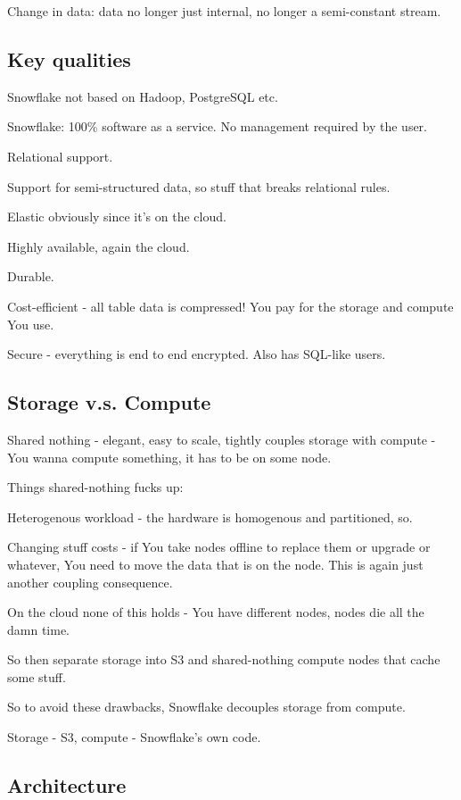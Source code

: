\documentclass{article}
\begin{document}
		Change in data: data no longer just internal, no longer a semi-constant stream.
	
	\subsection{Key qualities}
	
		Snowflake not based on Hadoop, PostgreSQL etc.
		
		Snowflake: 100\% software as a service. No management required by the user.
		
		Relational support.
		
		Support for semi-structured data, so stuff  that breaks relational rules.
		
		Elastic obviously since it's on the cloud.
		
		Highly available, again the cloud.
		
		Durable.
		
		Cost-efficient - all table data is compressed! You pay for the storage and compute You use. 
		
		Secure - everything is end to end encrypted. Also has SQL-like users.
		
	\subsection{Storage v.s. Compute}
	
		Shared nothing - elegant, easy to scale, tightly couples storage with compute - You wanna compute something, it has to be on some node.
		
		Things shared-nothing fucks up:
		
		Heterogenous workload - the hardware is homogenous and partitioned, so.
		
		Changing stuff costs - if You take nodes offline to replace them or upgrade or whatever, You need to move the data that is on the node. This is again just another coupling consequence.
		
		On the cloud none of this holds - You have different nodes, nodes die all the damn time.
		
		So then separate storage into S3 and shared-nothing compute nodes that cache some stuff.
		
		So to avoid these drawbacks, Snowflake decouples storage from compute.
		
		Storage - S3, compute - Snowflake's own code.
		
	\subsection{Architecture}
	
\end{document}
